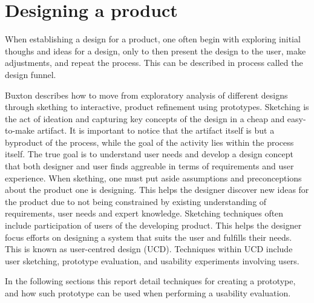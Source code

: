 \section{Designing a product} %
When establishing a design for a product, one often begin with exploring initial thoughs and ideas for a design, only to then present the design to the user, make adjustments, and repeat the process. 
This can be described in process called the design funnel.\cite{BUXTON2007135_skething}

Buxton\cite{BUXTON2007135_skething,BUXTON2007139_prototyping} describes how to move from exploratory analysis of different designs through skething to interactive, product refinement using prototypes.   
Sketching is the act of ideation and capturing key concepts of the design in a cheap and easy-to-make artifact. 
It is important to notice that the artifact itself is but a byproduct of the process, while the goal of the activity lies within the process itself.\cite{BUXTON2007135_skething}
The true goal is to understand user needs and develop a design concept that both designer and user finds aggreable in terms of requirements and user experience. 
When skething, one must put aside  assumptions and preconceptions about the product one is designing.
This helps the designer discover new ideas for the product due to not being constrained by existing  understanding of requirements, user needs and expert knowledge. %
Sketching techniques often include participation of users of the developing product.
This helps the designer focus efforts on designing a system that suits the user and fulfills their needs.
This is known as user-centred design (UCD). \cite{user-centred-design}
Techniques within UCD include user sketching, prototype evaluation, and usability experiments involving users.

In the following sections this report detail techniques for creating a prototype, and how such prototype can be used when performing a usability evaluation.